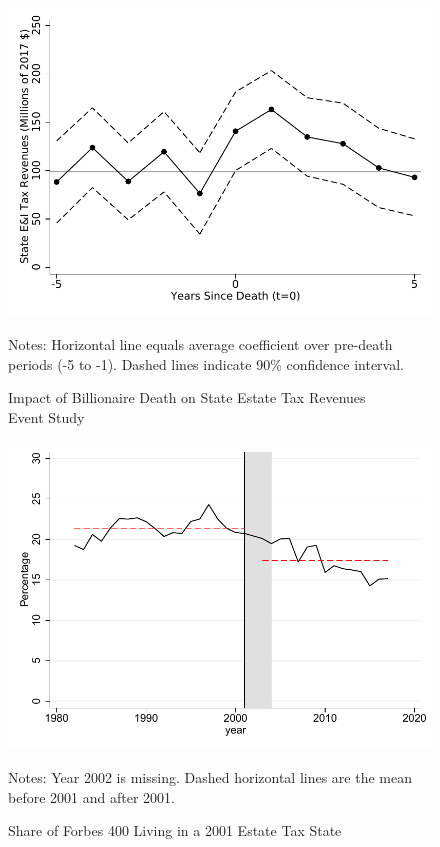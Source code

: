 \documentclass[12pt]{article}
\begin{document}
\clearpage
\begin{figure}
	\begin{center}
	\caption{Impact of Billionaire Death on State Estate Tax Revenues\\Event Study}
	\vspace{-12pt}
	\includegraphics[width=.8\textwidth]{../Figures/Figure4.pdf}
    \label{fig:event_study}
	\end{center}
	\vspace{-16pt}
    \footnotesize{Notes: Horizontal line equals average coefficient over pre-death periods (-5 to -1). Dashed lines indicate 90\% confidence interval.}
\end{figure}

\vspace{8pt}
\begin{figure}
    \vspace{12pt}
	\begin{center}
	\caption{Share of Forbes 400 Living in a 2001 Estate Tax State}	
	\vspace{-8pt}
	\includegraphics[width=.8\textwidth]{../Figures/Figure5.pdf}
    \label{fig:ShareIn2001ET}
	\end{center}
	\vspace{-16pt}
\footnotesize{Notes: Year 2002 is missing. Dashed horizontal lines are the mean before 2001 and after 2001.} 
\end{figure}
\clearpage
\end{document}
